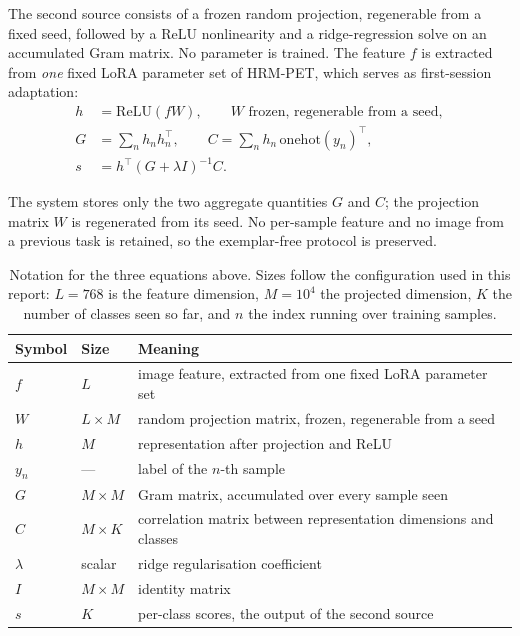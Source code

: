 \documentclass[11pt,a4paper]{article}
\begin{document}
The second source consists of a frozen random projection, regenerable from a
fixed seed, followed by a ReLU nonlinearity and a ridge-regression solve on an
accumulated Gram matrix. No parameter is trained. The feature $f$ is extracted
from \emph{one} fixed LoRA parameter set of HRM-PET, which serves as
first-session adaptation:
\begin{align}
h &= \mathrm{ReLU}(f W), \qquad W \text{ frozen, regenerable from a seed},\\
G &= \sum_n h_n h_n^{\top}, \qquad
C = \sum_n h_n\,\mathrm{onehot}(y_n)^{\top},\\
s &= h^{\top} (G + \lambda I)^{-1} C .
\label{eq:rp}
\end{align}

The system stores only the two aggregate quantities $G$ and $C$; the projection
matrix $W$ is regenerated from its seed. No per-sample feature and no image from
a previous task is retained, so the exemplar-free protocol is preserved.

\begin{table}[H]
\centering
\caption{Notation for the three equations above. Sizes follow the configuration
used in this report: $L = 768$ is the feature dimension, $M = 10^4$ the
projected dimension, $K$ the number of classes seen so far, and $n$ the index
running over training samples.}
\label{tab:notation}
\begin{tabular}{@{}llp{7.4cm}@{}}
\toprule
Symbol & Size & Meaning \\
\midrule
$f$        & $L$          & image feature, extracted from one fixed LoRA parameter set \\
$W$        & $L \times M$ & random projection matrix, frozen, regenerable from a seed \\
$h$        & $M$          & representation after projection and ReLU \\
$y_n$      & ---          & label of the $n$-th sample \\
$G$        & $M \times M$ & Gram matrix, accumulated over every sample seen \\
$C$        & $M \times K$ & correlation matrix between representation dimensions and classes \\
$\lambda$  & scalar       & ridge regularisation coefficient \\
$I$        & $M \times M$ & identity matrix \\
$s$        & $K$          & per-class scores, the output of the second source \\
\bottomrule
\end{tabular}
\end{table}
\end{document}
